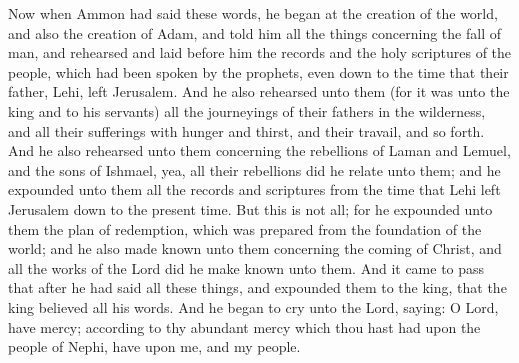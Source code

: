 Now when Ammon had said these words, he began at the creation of the world, and also the creation of Adam, and told him all the things concerning the fall of man, and rehearsed and laid before him the records and the holy scriptures of the people, which had been spoken by the prophets, even down to the time that their father, Lehi, left Jerusalem.
\bverse \iffalse And he also rehearsed unto them (for it was unto the king and to his servants) all the journeyings of their fathers in the wilderness, and all their sufferings with hunger and thirst, and their travail, and so forth. \fi
And he also rehearsed unto them (for it was unto the king and to his servants) all the journeyings of their fathers in the wilderness, and all their sufferings with hunger and thirst, and their travail, and so forth.
\bverse \iffalse And he also rehearsed unto them concerning the rebellions of Laman and Lemuel, and the sons of Ishmael, yea, all their rebellions did he relate unto them; and he expounded unto them all the records and scriptures from the time that Lehi left Jerusalem down to the present time. \fi
And he also rehearsed unto them concerning the rebellions of Laman and Lemuel, and the sons of Ishmael, yea, all their rebellions did he relate unto them; and he expounded unto them all the records and scriptures from the time that Lehi left Jerusalem down to the present time.
\bverse \iffalse But this is not all; for he expounded unto them the plan of redemption, which was prepared from the foundation of the world; and he also made known unto them concerning the coming of Christ, and all the works of the Lord did he make known unto them. \fi
But this is not all; for he expounded unto them the plan of redemption, which was prepared from the foundation of the world; and he also made known unto them concerning the coming of Christ, and all the works of the Lord did he make known unto them.
\bverse \iffalse And it came to pass that after he had said all these things, and expounded them to the king, that the king believed all his words. \fi
And it came to pass that after he had said all these things, and expounded them to the king, that the king believed all his words.
\bverse \iffalse And he began to cry unto the Lord, saying: O Lord, have mercy; according to thy abundant mercy which thou hast had upon the people of Nephi, have upon me, and my people. \fi
And he began to cry unto the Lord, saying: O Lord, have mercy; according to thy abundant mercy which thou hast had upon the people of Nephi, have upon me, and my people.
